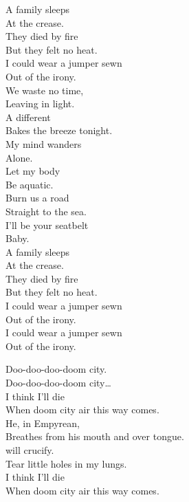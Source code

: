 A family sleeps \\
At the crease. \\
They died by fire \\
But they felt no heat. \\
I could wear a jumper sewn \\
Out of the irony. \\

We waste no time, \\
Leaving in light. \\
A different  \\
Bakes the breeze tonight. \\

My mind wanders \\
Alone. \\
Let my body \\
Be aquatic. \\

Burn us a road \\
Straight to the sea. \\
I'll be your seatbelt \\
Baby. \\

A family sleeps \\
At the crease. \\
They died by fire \\
But they felt no heat. \\
I could wear a jumper sewn \\
Out of the irony. \\

I could wear a jumper sewn \\
Out of the irony. \\





Doo-doo-doo-doom city. \\
Doo-doo-doo-doom city… \\

I think I'll die \\
When doom city air this way comes. \\
He, in Empyrean, \\
Breathes from his mouth and over tongue. \\
 will crucify. \\
Tear little holes in my lungs. \\
I think I'll die \\
When doom city air this way comes. \\

